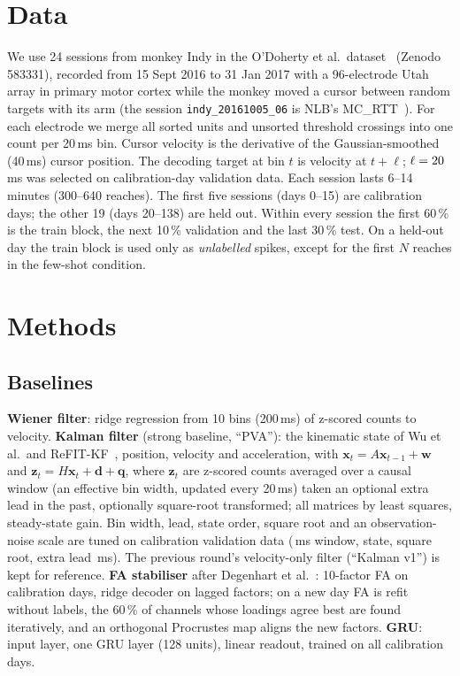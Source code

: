 \documentclass[10pt,twocolumn]{article}
\begin{document}
\section{Data}
We use 24 sessions from monkey Indy in the O'Doherty et al.\ dataset~\cite{odoherty2017data,makin2018superior}
(Zenodo 583331), recorded from 15 Sept 2016 to 31 Jan 2017 with a 96-electrode Utah array in
primary motor cortex while the monkey moved a cursor between random targets with its arm
(the session \texttt{indy\_20161005\_06} is NLB's MC\_RTT~\cite{pei2021nlb}). For each electrode
we merge all sorted units and unsorted threshold crossings into one count per 20\,ms bin.
Cursor velocity is the derivative of the Gaussian-smoothed (40\,ms) cursor position. The
decoding target at bin $t$ is velocity at $t+\ell$; $\ell=20$\,ms was selected on
calibration-day validation data. Each session lasts 6--14 minutes (300--640 reaches). The
first five sessions (days 0--15) are calibration days; the other 19 (days 20--138) are held out.
Within every session the first 60\,\% is the train block, the next 10\,\% validation and the
last 30\,\% test. On a held-out day the train block is used only as \emph{unlabelled}
spikes, except for the first $N$ reaches in the few-shot condition.

\section{Methods}
\subsection{Baselines}
\textbf{Wiener filter}: ridge regression from 10 bins (200\,ms) of z-scored counts to
velocity. \textbf{Kalman filter} (strong baseline, ``PVA''): the kinematic state of Wu et al.\ and
ReFIT-KF~\cite{wu2006kalman,gilja2012refit}, position, velocity and acceleration, with
$\mathbf{x}_t=A\mathbf{x}_{t-1}+\mathbf{w}$ and $\mathbf{z}_t=H\mathbf{x}_t+\mathbf{d}+\mathbf{q}$,
where $\mathbf{z}_t$ are z-scored counts averaged over a causal window (an effective bin width,
updated every 20\,ms) taken an optional extra lead in the past, optionally square-root
transformed; all matrices by least squares, steady-state gain. Bin width, lead, state order,
square root and an observation-noise scale are tuned on calibration validation data
(\kfSmooth\,ms window, \kfOrder{} state, \kfSqrt{} square root, extra lead \kfDelay\,ms). The
previous round's velocity-only filter (``Kalman v1'') is kept for reference.
\textbf{FA stabiliser} after Degenhart et al.\ \cite{degenhart2020stabilization}:
10-factor FA on calibration days, ridge decoder on lagged factors; on a new day FA is refit
without labels, the 60\,\% of channels whose loadings agree best are found iteratively, and
an orthogonal Procrustes map aligns the new factors. \textbf{GRU}: input layer, one GRU layer
(128 units), linear readout, trained on all calibration days.
\end{document}
